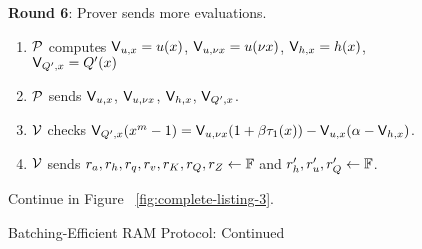 \begin{figure}[t!]
\begin{mdframed}
        {\bf Round 6}: Prover sends more evaluations.
        \begin{enumerate}[leftmargin=1em, label=\arabic*.]
            \item $\prover$ computes $\val{x}{u}=u(x)$, $\val{\nu x}{u}=u(\nu x)$, $\val{x}{h}=h(x)$, $\val{x}{Q'}=Q'(x)$
            \item $\prover$ sends $\val{x}{u}$, $\val{\nu x}{u}$, $\val{x}{h}$, $\val{x}{Q'}$.
            \item $\verifier$ checks $\val{x}{Q'}(x^m-1)=\val{\nu x}{u}(1+\beta \tau_1(x))-\val{x}{u}(\alpha - \val{x}{h})$.
            \item $\verifier$ sends $r_a, r_h, r_q, r_v, r_K, r_Q, r_Z\gets \F$ and $r_h', r_u', r_Q'\gets \F$.
        \end{enumerate}

        \begin{center}
            Continue in Figure ~\ref{fig:complete-listing-3}.
        \end{center}


    \end{mdframed}
    \caption{Batching-Efficient RAM Protocol: Continued}
    \label{fig:complete-listing-2}
\end{figure}

